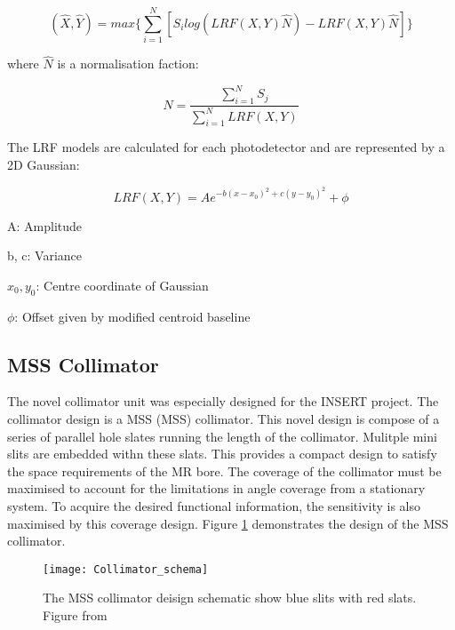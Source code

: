 \begin{equation} \label{eqn:PERA}
                (\hat{X},\hat{Y}) = max\{ \sum^{N}_{i=1} [ S_{i}log(LRF(X,Y) \hat{N}) - LRF(X,Y) \hat{N} ] \}
\end{equation}

where $\hat{N}$ is a normalisation faction:

\begin{equation} \label{eqn:Norm}
                \hat{N} = \frac{\sum^{N}_{i=1} S_{j}}{\sum^{N}_{i=1} LRF(X,Y)}
\end{equation}

The \acrshort{LRF} models are calculated for each photodetector and are represented by a 2D Gaussian: 

\begin{equation} \label{eqn:LRF}
    LRF(X,Y) = Ae^{-b(x-x_{0})^{2} + c(y-y_{0})^2} + \phi
\end{equation}

\begin{description}
    \item{A}: Amplitude
    \vspace{-0.5cm}
    \item{b, c}: Variance
    \vspace{-0.5cm}
    \item{$x_{0}, y_{0}$}: Centre coordinate of Gaussian
   \vspace{-0.5cm}
    \item{$\phi$}: Offset given by modified centroid baseline
\end{description}

\subsection{MSS Collimator}
The novel collimator unit was especially designed for the INSERT project. The collimator design is a \acrlong{MSS} (\acrshort{MSS}) collimator. This novel design is compose of a series of parallel hole slates running the length of the collimator. Mulitple mini slits are embedded withn these slats. This provides a compact design to satisfy the space requirements of the \acrshort{MR} bore. The coverage of the collimator must be maximised to account for the limitations in angle coverage from a stationary system. To acquire the desired functional information, the sensitivity is also maximised by this coverage design. Figure \ref{fig:MSSColl} demonstrates the design of the MSS collimator.


\begin{figure}[htp]
    \centering
    \texttt{[image: Collimator\_schema]} %
    \caption{The MSS collimator deisign schematic show blue slits with red slats. Figure from \cite{8069508}} \label{fig:MSSColl}
\end{figure}

